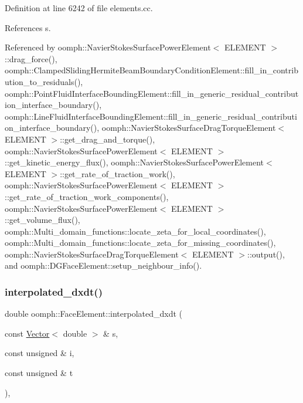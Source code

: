 Definition at line 6242 of file elements.\+cc.



References s.



Referenced by oomph\+::\+Navier\+Stokes\+Surface\+Power\+Element$<$ E\+L\+E\+M\+E\+N\+T $>$\+::drag\+\_\+force(), oomph\+::\+Clamped\+Sliding\+Hermite\+Beam\+Boundary\+Condition\+Element\+::fill\+\_\+in\+\_\+contribution\+\_\+to\+\_\+residuals(), oomph\+::\+Point\+Fluid\+Interface\+Bounding\+Element\+::fill\+\_\+in\+\_\+generic\+\_\+residual\+\_\+contribution\+\_\+interface\+\_\+boundary(), oomph\+::\+Line\+Fluid\+Interface\+Bounding\+Element\+::fill\+\_\+in\+\_\+generic\+\_\+residual\+\_\+contribution\+\_\+interface\+\_\+boundary(), oomph\+::\+Navier\+Stokes\+Surface\+Drag\+Torque\+Element$<$ E\+L\+E\+M\+E\+N\+T $>$\+::get\+\_\+drag\+\_\+and\+\_\+torque(), oomph\+::\+Navier\+Stokes\+Surface\+Power\+Element$<$ E\+L\+E\+M\+E\+N\+T $>$\+::get\+\_\+kinetic\+\_\+energy\+\_\+flux(), oomph\+::\+Navier\+Stokes\+Surface\+Power\+Element$<$ E\+L\+E\+M\+E\+N\+T $>$\+::get\+\_\+rate\+\_\+of\+\_\+traction\+\_\+work(), oomph\+::\+Navier\+Stokes\+Surface\+Power\+Element$<$ E\+L\+E\+M\+E\+N\+T $>$\+::get\+\_\+rate\+\_\+of\+\_\+traction\+\_\+work\+\_\+components(), oomph\+::\+Navier\+Stokes\+Surface\+Power\+Element$<$ E\+L\+E\+M\+E\+N\+T $>$\+::get\+\_\+volume\+\_\+flux(), oomph\+::\+Multi\+\_\+domain\+\_\+functions\+::locate\+\_\+zeta\+\_\+for\+\_\+local\+\_\+coordinates(), oomph\+::\+Multi\+\_\+domain\+\_\+functions\+::locate\+\_\+zeta\+\_\+for\+\_\+missing\+\_\+coordinates(), oomph\+::\+Navier\+Stokes\+Surface\+Drag\+Torque\+Element$<$ E\+L\+E\+M\+E\+N\+T $>$\+::output(), and oomph\+::\+D\+G\+Face\+Element\+::setup\+\_\+neighbour\+\_\+info().

\mbox{\label{classoomph_1_1FaceElement_a0bd0b6164be27b3e959de84c609ca0ff}} 
\subsubsection{\texorpdfstring{interpolated\+\_\+dxdt()}{interpolated\_dxdt()}\hspace{0.1cm}{\footnotesize\ttfamily [1/2]}}
{\footnotesize\ttfamily double oomph\+::\+Face\+Element\+::interpolated\+\_\+dxdt (\begin{DoxyParamCaption}\item[{const \hyperlink{classoomph_1_1Vector}{Vector}$<$ double $>$ \&}]{s,  }\item[{const unsigned \&}]{i,  }\item[{const unsigned \&}]{t }\end{DoxyParamCaption})\hspace{0.3cm}{\ttfamily [inline]}, {\ttfamily [virtual]}}



